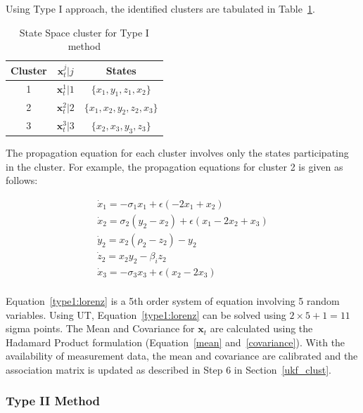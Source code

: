 Using Type I approach, the identified clusters are tabulated in Table~\ref{Type1_cluster_lorenz}.

\begin{table}[H]
\centering
\caption{State Space cluster for Type I method}
\label{Type1_cluster_lorenz}
\begin{tabular}{c|c|c}
\hline 
Cluster & $\textbf{x}_t^j|j$ & States \\
\hline 
1 & $\textbf{x}_t^1|1$ & $\lbrace x_1,y_1,z_1,x_2 \rbrace$ \\ 
2 & $\textbf{x}_t^2|2$ & $\lbrace x_1,x_2,y_2,z_2,x_3 \rbrace$  \\ 
3 & $\textbf{x}_t^3|3$ & $\lbrace x_2, x_3, y_3, z_3 \rbrace$ \\ 
\hline 
\end{tabular} 
\end{table}

The propagation equation for each cluster involves only the states participating in the cluster. For example, the propagation equations for cluster 2 is given as follows:

\begin{equation}
\label{type1:lorenz}
\begin{array}{l}
\dot{x}_1 = -\sigma_1 x_1 +\epsilon(- 2x_1 + x_2) \\
\dot{x}_2 = \sigma_2(y_2 - x_2) +\epsilon(x_1 - 2x_2 + x_3) \\
\dot{y}_2 = x_2 (\rho_2 - z_2) - y_2 \\
\dot{z}_2 = x_2 y_2 - \beta_i z_2  \\
\dot{x}_3 = -\sigma_3 x_3 +\epsilon(x_2 - 2x_3) \\
\end{array}
\end{equation}

Equation~\ref{type1:lorenz} is a 5th order system of equation involving 5 random variables. Using UT, Equation~\ref{type1:lorenz} can be solved using $2 \times 5 + 1 = 11$ sigma points. The Mean and Covariance for $\textbf{x}_t$ are calculated using the Hadamard Product formulation (Equation~\ref{mean} and~\ref{covariance}). With the availability of measurement data, the mean and covariance are calibrated and the association matrix is updated as described in Step 6 in Section~\ref{ukf_clust}.

\subsubsection{Type II Method}
 
